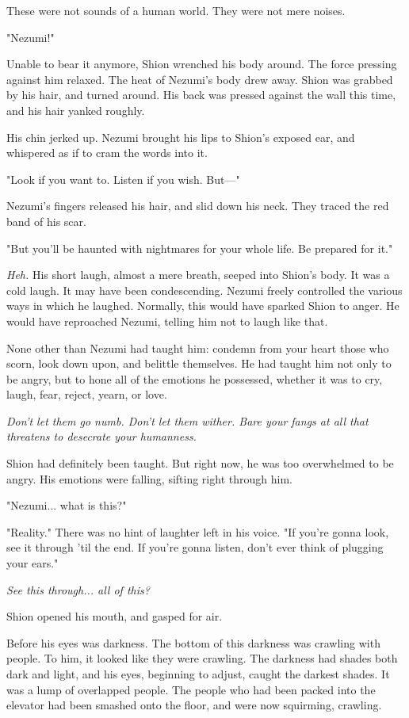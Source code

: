 These were not sounds of a human world. They were not mere noises.

"Nezumi!"

Unable to bear it anymore, Shion wrenched his body around. The force
pressing against him relaxed. The heat of Nezumi's body drew away. Shion
was grabbed by his hair, and turned around. His back was pressed against
the wall this time, and his hair yanked roughly.

His chin jerked up. Nezumi brought his lips to Shion's exposed ear, and
whispered as if to cram the words into it.

"Look if you want to. Listen if you wish. But---"

Nezumi's fingers released his hair, and slid down his neck. They traced
the red band of his scar.

"But you'll be haunted with nightmares for your whole life. Be prepared
for it."

\emph{Heh.} His short laugh, almost a mere breath, seeped into Shion's body. It
was a cold laugh. It may have been condescending. Nezumi freely
controlled the various ways in which he laughed. Normally, this would
have sparked Shion to anger. He would have reproached Nezumi, telling
him not to laugh like that.

None other than Nezumi had taught him: condemn from your heart those who
scorn, look down upon, and belittle themselves. He had taught him not
only to be angry, but to hone all of the emotions he possessed, whether
it was to cry, laugh, fear, reject, yearn, or love.

\emph{Don't let them go numb. Don't let them wither. Bare your fangs at all
that threatens to desecrate your humanness.}

Shion had definitely been taught. But right now, he was too overwhelmed
to be angry. His emotions were falling, sifting right through him.

"Nezumi... what is this?"

"Reality." There was no hint of laughter left in his voice. "If you're
gonna look, see it through 'til the end. If you're gonna listen, don't
ever think of plugging your ears."

\emph{See this through... all of this?}

Shion opened his mouth, and gasped for air.

Before his eyes was darkness. The bottom of this darkness was crawling
with people. To him, it looked like they were crawling. The darkness had
shades both dark and light, and his eyes, beginning to adjust, caught
the darkest shades. It was a lump of overlapped people. The people who
had been packed into the elevator had been smashed onto the floor, and
were now squirming, crawling.

